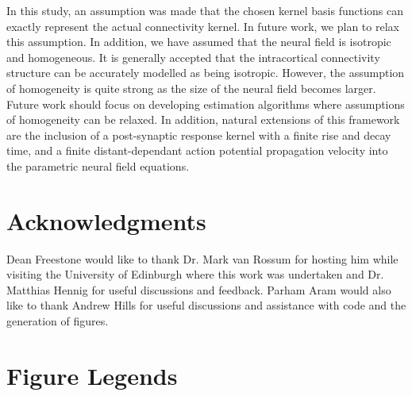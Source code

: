 \documentclass[10pt]{article}
\begin{document}
In this study, an assumption was made that the chosen kernel basis functions can exactly represent the actual connectivity kernel. In future work, we plan to relax this assumption. In addition, we have assumed that the neural field is isotropic and homogeneous. It is generally accepted that the intracortical connectivity structure can be accurately modelled as being isotropic. However, the assumption of homogeneity is quite strong as the size of the neural field becomes larger. Future work should focus on developing estimation algorithms where assumptions of homogeneity can be relaxed. In addition, natural extensions of this framework are the inclusion of a post-synaptic response kernel with a finite rise and decay time, and a finite distant-dependant action potential propagation velocity into the parametric neural field equations.

\section*{Acknowledgments}
Dean Freestone would like to thank Dr. Mark van Rossum for hosting him while visiting the University of Edinburgh where this work was undertaken and Dr. Matthias Hennig for useful discussions and feedback. Parham Aram would also like to thank Andrew Hills for useful discussions and assistance with code and the generation of figures.




\section*{Figure Legends}
\end{document}
